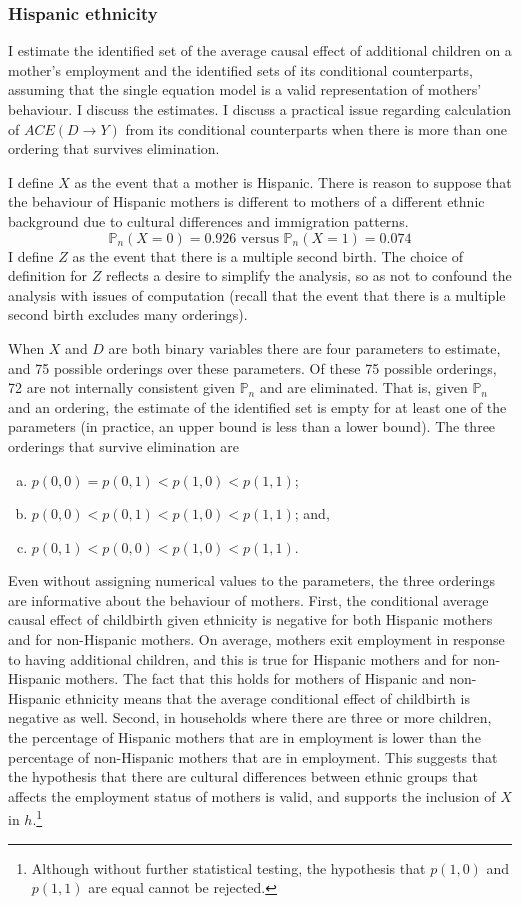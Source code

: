\documentclass[12pt,a4paper,twoside]{article}
\numberwithin{equation}{section}
\begin{document}
\subsubsection{Hispanic ethnicity}
I estimate the identified set of the average causal effect of additional children on a mother's employment and the identified sets of its conditional counterparts, assuming that the single equation model is a valid representation of mothers' behaviour. I discuss the estimates. I discuss a practical issue regarding calculation of $ACE(D\rightarrow Y)$ from its conditional counterparts when there is more than one ordering that survives elimination. 

I define $X$ as the event that a mother is Hispanic. There is reason to suppose that the behaviour of Hispanic mothers is different to mothers of a different ethnic background due to cultural differences and immigration patterns.   
\[\mathbb{P}_n(X=0)=0.926\text{ versus }\mathbb{P}_n(X=1)=0.074\] 
I define $Z$ as the event that there is a multiple second birth. The choice of definition for $Z$ reflects a desire to simplify the analysis, so as not to confound the analysis with issues of computation (recall that the event that there is a multiple second birth excludes many orderings).

When $X$ and $D$ are both binary variables there are four parameters to estimate, and 75 possible orderings over these parameters. Of these 75 possible orderings, 72 are not internally consistent given $\mathbb{P}_n$ and are eliminated. That is, given $\mathbb{P}_n$ and an ordering, the estimate of the identified set is empty for at least one of the parameters (in practice, an upper bound is less than a lower bound). The three orderings that survive elimination are
\begin{enumerate}[(a)]
\item $p(0,0)=p(0,1)<p(1,0)<p(1,1)$;
\item $p(0,0)<p(0,1)<p(1,0)<p(1,1)$; and,
\item $p(0,1)<p(0,0)<p(1,0)<p(1,1)$.
\end{enumerate}
Even without assigning numerical values to the parameters, the three orderings are informative about the behaviour of mothers. First, the conditional average causal effect of childbirth given ethnicity is negative for both Hispanic mothers and for non-Hispanic mothers. On average, mothers exit employment in response to having additional children, and this is true for Hispanic mothers and for non-Hispanic mothers. The fact that this holds for mothers of Hispanic and non-Hispanic ethnicity means that the average conditional effect of childbirth is negative as well. Second, in households where there are three or more children, the percentage of Hispanic mothers that are in employment is lower than the percentage of non-Hispanic mothers that are in employment. This suggests that the hypothesis that there are cultural differences between ethnic groups that affects the employment status of mothers is valid, and supports the inclusion of $X$ in $h$.\footnote{Although without further statistical testing, the hypothesis that $p(1,0)$ and $p(1,1)$ are equal cannot be rejected.}
\end{document}
